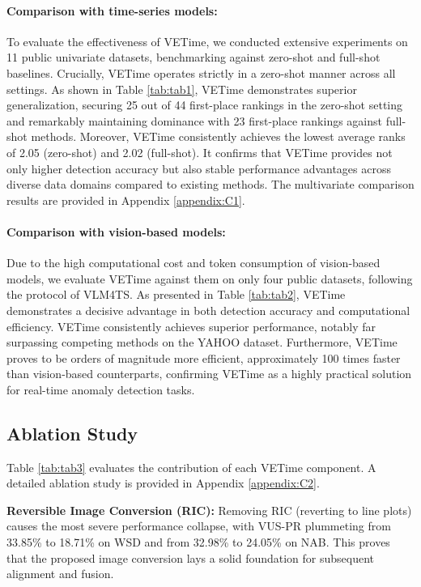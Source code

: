 \documentclass{article}
\theoremstyle{plain}
\theoremstyle{definition}
\theoremstyle{remark}
\begin{document}
\paragraph{Comparison with time-series models:}
To evaluate the effectiveness of VETime, we conducted extensive experiments on 11 public univariate datasets, benchmarking against zero-shot and full-shot baselines. Crucially, VETime operates strictly in a zero-shot manner across all settings.
As shown in Table \ref{tab:tab1}, VETime demonstrates superior generalization, securing 25 out of 44 first-place rankings in the zero-shot setting and remarkably maintaining dominance with 23 first-place rankings against full-shot methods. Moreover, VETime consistently achieves the lowest average ranks of 2.05 (zero-shot) and 2.02 (full-shot).
It confirms that VETime provides not only higher detection accuracy but also stable performance advantages across diverse data domains compared to existing methods. The multivariate comparison results are provided in Appendix \ref{appendix:C1}.


\paragraph{Comparison with vision-based models:}
Due to the high computational cost and token consumption of vision-based models, we evaluate VETime against them on only four public datasets, following the protocol of VLM4TS\cite{he2025harnessing}.
As presented in Table \ref{tab:tab2}, VETime demonstrates a decisive advantage in both detection accuracy and computational efficiency. VETime consistently achieves superior performance, notably far surpassing competing methods on the YAHOO dataset. Furthermore, VETime proves to be orders of magnitude more efficient, approximately 100 times faster than vision-based counterparts, confirming VETime as a highly practical solution for real-time anomaly detection tasks.

\subsection{Ablation Study}
Table \ref{tab:tab3} evaluates the contribution of each VETime component. A detailed ablation study is provided in Appendix \ref{appendix:C2}.

\textbf{Reversible Image Conversion (RIC):} Removing RIC (reverting to line plots) causes the most severe performance collapse, with VUS-PR plummeting from 33.85\% to 18.71\% on WSD and from 32.98\% to 24.05\% on NAB. This proves that the proposed image conversion lays a solid foundation for subsequent alignment and fusion.
\end{document}
